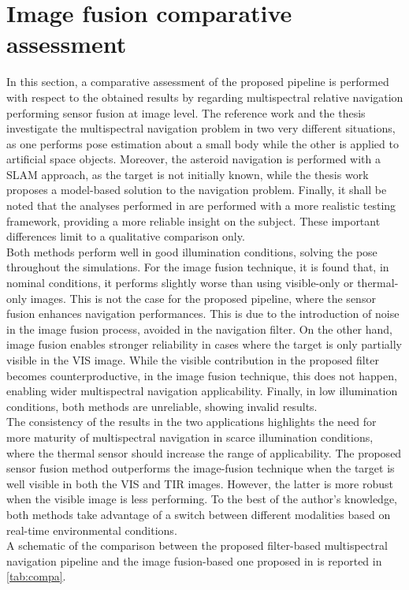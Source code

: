 \section{Image fusion comparative assessment}
In this section, a comparative assessment of the proposed pipeline is performed with respect to the obtained results by \cite{piccinin2023spacecraft} regarding multispectral relative navigation performing sensor fusion at image level. The reference work and the thesis investigate the multispectral navigation problem in two very different situations, as one performs pose estimation about a small body while the other is applied to artificial space objects. Moreover, the asteroid navigation is performed with a SLAM approach, as the target is not initially known, while the thesis work proposes a model-based solution to the navigation problem. Finally, it shall be noted that the analyses performed in \cite{piccinin2023spacecraft} are performed with a more realistic testing framework, providing a more reliable insight on the subject. These important differences limit to a qualitative comparison only.\\
Both methods perform well in good illumination conditions, solving the pose throughout the simulations. For the image fusion technique, it is found that, in nominal conditions, it performs slightly worse than using visible-only or thermal-only images. This is not the case for the proposed pipeline, where the sensor fusion enhances navigation performances. This is due to the introduction of noise in the image fusion process, avoided in the navigation filter. On the other hand, image fusion enables stronger reliability in cases where the target is only partially visible in the VIS image. While the visible contribution in the proposed filter becomes counterproductive, in the image fusion technique, this does not happen, enabling wider multispectral navigation applicability. Finally, in low illumination conditions, both methods are unreliable, showing invalid results.\\
The consistency of the results in the two applications highlights the need for more maturity of multispectral navigation in scarce illumination conditions, where the thermal sensor should increase the range of applicability. The proposed sensor fusion method outperforms the image-fusion technique when the target is well visible in both the VIS and TIR images. However, the latter is more robust when the visible image is less performing. To the best of the author's knowledge, both methods take advantage of a switch between different modalities based on real-time environmental conditions. \\
A schematic of the comparison between the proposed filter-based multispectral navigation pipeline and the image fusion-based one proposed in \cite{piccinin2023spacecraft} is reported in \cref{tab:compa}.


